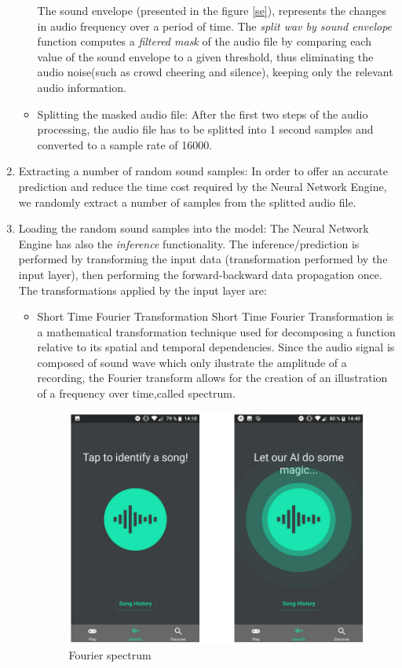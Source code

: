 \begin{enumerate}
\begin{itemize}
	The sound envelope (presented in the figure \ref{se}), represents the changes in audio frequency over a period
	of time. The \textit{split wav by sound envelope} function computes a \textit{filtered mask} of the audio file
	by comparing each value of the sound envelope to a given threshold, thus eliminating the audio noise(such as
	crowd cheering and silence), keeping only the relevant audio information.

			\item Splitting the masked audio file: After the first two steps of the audio processing,
	the audio file has to be splitted into 1 second samples and converted to a sample rate of 16000.
		\end{itemize}

	\item Extracting a number of random sound samples: In order to offer an accurate prediction and reduce the
	time cost required by the Neural Network Engine, we randomly extract a number of samples from the splitted audio
	file.
\item Loading the random sound samples into the model: The Neural Network Engine has also the \textit{inference}
	functionality. The inference/prediction is performed by transforming the input data (transformation performed
	by the input layer), then performing the forward-backward data propagation once.
	The transformations applied by the input layer are:
	\begin{itemize}

		\item Short Time Fourier Transformation
		Short Time Fourier Transformation is a mathematical transformation technique used for
		decomposing a function relative to its spatial and temporal dependencies. Since the audio signal is
		composed of sound wave which only ilustrate the amplitude of
		a recording, the Fourier transform allows for the creation of an illustration of a frequency
		over time,called spectrum. \cite{ft}

			\begin{figure}[H]
				\centering
				\includegraphics{images/spektrum.png}
				\caption{Fourier spectrum}
			\label{ft}
			\end{figure}



\end{itemize}
\end{enumerate}
